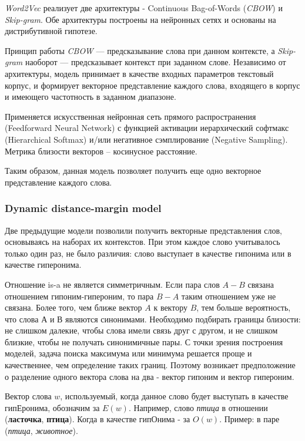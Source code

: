 \textit{Word2Vec} реализует две архитектуры - Continuous Bag-of-Words (\textit{CBOW}) и \textit{Skip-gram}. Обе архитектуры построены на нейронных сетях и основаны на дистрибутивной гипотезе.

Принцип работы \textit{CBOW} — предсказывание слова при данном контексте, а \textit{Skip-gram}
наоборот — предсказывает контекст при заданном слове. Независимо от архитектуры,
модель принимает в качестве входных параметров текстовый корпус, и формирует
векторное представление каждого слова, входящего в корпус и имеющего частотность в
заданном диапазоне.

Применяется искусственная нейронная сеть прямого распространения (Feedforward Neural
Network) с функцией активации иерархический софтмакс (Hierarchical Softmax) и/или
негативное сэмплирование (Negative Sampling). Метрика близости векторов – косинусное
расстояние.

Таким образом, данная модель позволяет получить еще одно векторное представление
каждого слова.

\subsubsection{Dynamic distance-margin model}

Две предыдущие модели позволили получить векторные представления слов,
основываясь на наборах их контекстов. При этом каждое слово учитывалось
только один раз, не было различия: слово выступает в качестве гипонима или в
качестве гиперонима.

Отношение is-a не является симметричным. Если пара слов $A-B$ связана
отношением гипоним-гипероним, то пара $B-A$ таким отношением уже не связана.
Более того, чем ближе вектор $A$ к вектору $B$, тем больше вероятность, что слова $А$
и $В$ являются синонимами. Необходимо подбирать границы близости: не слишком
далекие, чтобы слова имели связь друг с другом, и не слишком близкие, чтобы не
получать синонимичные пары. С точки зрения построения моделей, задача поиска
максимума или минимума решается проще и качественнее, чем определение таких
границ. Поэтому возникает предположение о разделение одного вектора слова на
два - вектор гипоним и вектор гипероним.

Вектор слова \textbf{$w$}, используемый, когда данное слово будет выступать в качестве
гипЕронима, обозначим за \textbf{$E(w)$}. Например, слово \textit{птица} в отношении (\textbf{ласточка}, \textbf{птица}). Когда в качестве гипОнима - за \textbf{$O(w)$}. Пример: в паре (\textit{птица}, \textit{животное}).

